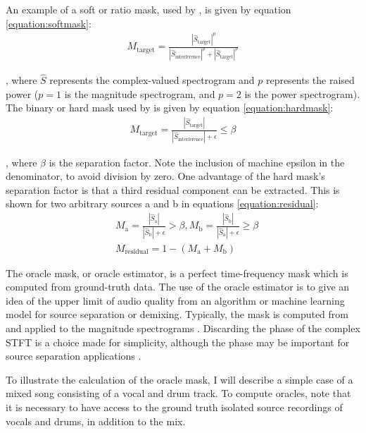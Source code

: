 \documentclass[report.tex]{subfiles}
\begin{document}
An example of a soft or ratio mask, used by \textcite{fitzgerald1, fitzgerald2}, is given by equation \eqref{equation:softmask}:
\begin{align}
	M_{\text{target}} = \frac{|\hat{S}_{\text{target}}|^{p}}{|\hat{S}_{\text{interference}}|^{p} + |\hat{S}_{\text{target}}|^{p}}\tag{16}\label{equation:softmask}
\end{align}

, where $\hat{S}$ represents the complex-valued spectrogram and $p$ represents the raised power ($p = 1$ is the magnitude spectrogram, and $p = 2$ is the power spectrogram). The binary or hard mask used by \textcite{driedger} is given by equation \eqref{equation:hardmask}:
\begin{align}
	M_{\text{target}} = \frac{|\hat{S}_{\text{target}}|}{|\hat{S}_{\text{interference}}| + \epsilon} \le \beta\tag{17}\label{equation:hardmask}
\end{align}

, where $\beta$ is the separation factor. Note the inclusion of machine epsilon in the denominator, to avoid division by zero. One advantage of the hard mask's separation factor is that a third residual component can be extracted. This is shown for two arbitrary sources a and b in equations \eqref{equation:residual}:
\begin{align}\tag{18}\label{equation:residual}
	\nonumber & M_{\text{a}} = \frac{|\hat{S}_{\text{a}}|}{|\hat{S}_{\text{b}}| + \epsilon} > \beta, M_{\text{b}} = \frac{|\hat{S}_{\text{b}}|}{|\hat{S}_{\text{a}}| + \epsilon} \ge \beta\\
	\nonumber & M_{\text{residual}} = 1 - (M_{\text{a}} + M_{\text{b}})
\end{align}

The oracle mask, or oracle estimator, is a perfect time-frequency mask which is computed from ground-truth data. The use of the oracle estimator is to give an idea of the upper limit of audio quality from an algorithm or machine learning model for source separation or demixing. Typically, the mask is computed from and applied to the magnitude spectrograms \parencite{fitzgerald1, fitzgerald2, driedger, umx, plumbley1, plumbley2}. Discarding the phase of the complex STFT is a choice made for simplicity, although the phase may be important for source separation applications \parencite{ditchphase}.

To illustrate the calculation of the oracle mask, I will describe a simple case of a mixed song consisting of a vocal and drum track. To compute oracles, note that it is necessary to have access to the ground truth isolated source recordings of vocals and drums, in addition to the mix.
\end{document}
